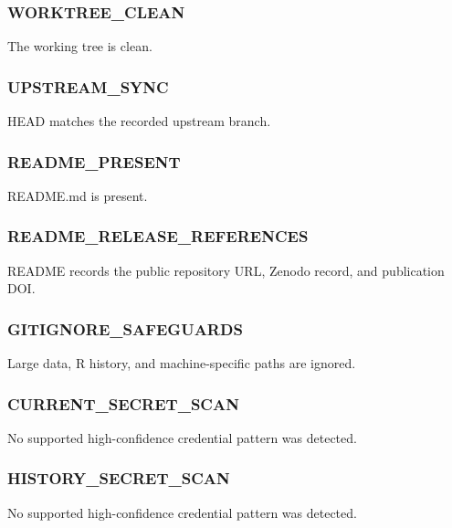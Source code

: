 \documentclass[
]{article}
\begin{document}
\subsubsection{WORKTREE\_CLEAN}\label{worktree_clean}

The working tree is clean.

\subsubsection{UPSTREAM\_SYNC}\label{upstream_sync}

HEAD matches the recorded upstream branch.

\subsubsection{README\_PRESENT}\label{readme_present}

README.md is present.

\subsubsection{README\_RELEASE\_REFERENCES}\label{readme_release_references}

README records the public repository URL, Zenodo record, and publication
DOI.

\subsubsection{GITIGNORE\_SAFEGUARDS}\label{gitignore_safeguards}

Large data, R history, and machine-specific paths are ignored.

\subsubsection{CURRENT\_SECRET\_SCAN}\label{current_secret_scan}

No supported high-confidence credential pattern was detected.

\subsubsection{HISTORY\_SECRET\_SCAN}\label{history_secret_scan}

No supported high-confidence credential pattern was detected.
\end{document}
